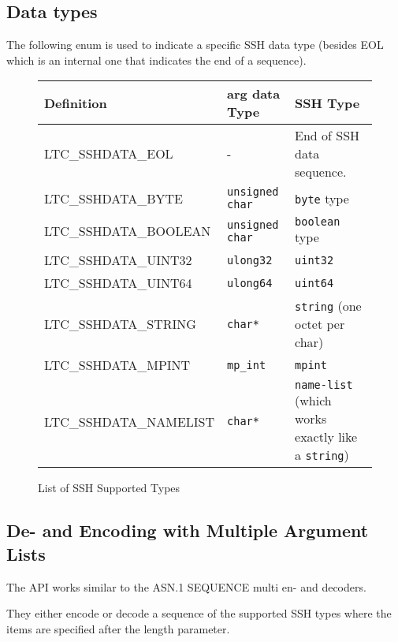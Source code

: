 \documentclass[synpaper]{book}
\begin{document}
\subsection{Data types}

The following enum is used to indicate a specific SSH data type
(besides EOL which is an internal one that indicates the end of a sequence).

\begin{figure}[h]
\begin{center}
\begin{small}
\begin{tabular}{|l|l|l|}
\hline \textbf{Definition}    & \textbf{arg data Type} & \textbf{SSH Type} \\
\hline LTC\_SSHDATA\_EOL      & -                      & End of SSH data sequence. \\
\hline LTC\_SSHDATA\_BYTE     & \texttt{unsigned char} & \texttt{byte} type \\
\hline LTC\_SSHDATA\_BOOLEAN  & \texttt{unsigned char} & \texttt{boolean} type \\
\hline LTC\_SSHDATA\_UINT32   & \texttt{ulong32}       & \texttt{uint32} \\
\hline LTC\_SSHDATA\_UINT64   & \texttt{ulong64}       & \texttt{uint64} \\
\hline LTC\_SSHDATA\_STRING   & \texttt{char*}         & \texttt{string} (one octet per char) \\
\hline LTC\_SSHDATA\_MPINT    & \texttt{mp\_int}       & \texttt{mpint} \\
\hline LTC\_SSHDATA\_NAMELIST & \texttt{char*}         & \texttt{name-list} (which works exactly like a \texttt{string}) \\
\hline
\end{tabular}
\caption{List of SSH Supported Types}
\end{small}
\end{center}
\end{figure}

\subsection{De- and Encoding with Multiple Argument Lists}



The API works similar to the ASN.1 SEQUENCE multi en- and decoders.

They either encode or decode a sequence of the supported SSH types where the items are specified after the length parameter.
\end{document}
